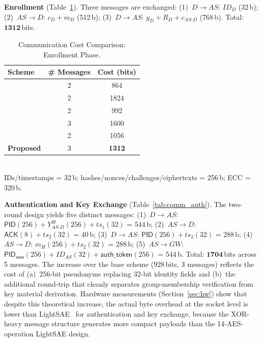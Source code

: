 \documentclass[conference]{IEEEtran}
\begin{document}
\textbf{Enrollment} (Table~\ref{tab:comm_enroll}).
Three messages are exchanged: (1)~$D \to AS$: $ID_D$ (32\,b);
(2)~$AS \to D$: $c_D + m_D$ (512\,b);
(3)~$D \to AS$: $y_D + R_D + c_{AS\text{-}D}$ (768\,b).
Total: $\mathbf{1312}$\,bits.

\begin{table}[!t]
  \centering
  \caption{Communication Cost Comparison: Enrollment Phase.}
  \label{tab:comm_enroll}
  \scriptsize
  \setlength{\tabcolsep}{3pt}
  \begin{tabular}{lcc}
    \toprule
    Scheme & \# Messages & Cost (bits) \\
    \midrule
    \cite{alruwaili2025raaf} & 2 & 864 \\
    \cite{yang2024sakms}     & 2 & 1824 \\
    \cite{li2020puf}         & 2 & 992 \\
    \cite{zheng2022puf}      & 3 & 1600 \\
    \cite{rosa2023lightsae}  & 2 & 1056 \\
    \textbf{Proposed}        & 3 & \textbf{1312} \\
    \bottomrule
  \end{tabular}\\[3pt]
  \scriptsize
  IDs/timestamps = 32\,b; hashes/nonces/challenges/ciphertexts = 256\,b; ECC = 320\,b.
\end{table}

\textbf{Authentication and Key Exchange} (Table~\ref{tab:comm_auth}).
The two-round design yields five distinct messages:
(1)~$D \to AS$: $\mathsf{PID}(256) + Y_{AS\text{-}D}^H(256) + ts_1(32)$ = 544\,b;
(2)~$AS \to D$: $\mathsf{ACK}(8) + ts_2(32)$ = 40\,b;
(3)~$D \to AS$: $\mathsf{PID}(256) + ts_2(32)$ = 288\,b;
(4)~$AS \to D$: $m_H(256) + ts_2(32)$ = 288\,b;
(5)~$AS \to GW$: $\mathsf{PID}_\mathsf{new}(256) + ID_{AS}(32) + \mathsf{auth\_token}(256)$ = 544\,b.
Total: $\mathbf{1704}$\,bits across 5 messages.  The increase over the base
scheme (928\,bits, 3 messages) reflects the cost of (a)~256-bit pseudonyms
replacing 32-bit identity fields and (b)~the additional round-trip that
cleanly separates group-membership verification from key material derivation.
Hardware measurements (Section~\ref{sec:hw}) show that despite this
theoretical increase, the actual byte overhead at the socket level is lower
than LightSAE~\cite{rosa2023lightsae} for authentication and key exchange,
because the XOR-heavy message structure generates more compact payloads than
the 14-AES-operation LightSAE design.
\end{document}
